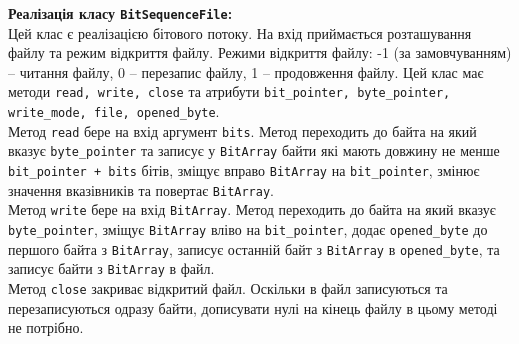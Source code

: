 \documentclass{article}
\def\code#1{\texttt{#1}}
\begin{document}
\textbf{Реалізація класу \code{BitSequenceFile}:}\\\indent
Цей клас є реалізацією бітового потоку. 
На вхід приймається розташування файлу та режим відкриття файлу. Режими відкриття файлу: -1 (за замовчуванням) -- читання файлу, 0 -- перезапис файлу, 1 -- продовження файлу. 
Цей клас має методи \code{read, write, close} та атрибути \code{bit\_pointer, byte\_pointer, write\_mode, file, opened\_byte}.\\\indent
Метод \code{read} бере на вхід аргумент \code{bits}. Метод переходить до байта на який вказує \code{byte\_pointer} та записує у \code{BitArray} байти які мають довжину не менше \code{bit\_pointer + bits} бітів, зміщує вправо \code{BitArray} на \code{bit\_pointer}, змінює значення вказівників та повертає \code{BitArray}.\\\indent
Метод \code{write} бере на вхід \code{BitArray}. Метод переходить до байта на який вказує \code{byte\_pointer}, зміщує \code{BitArray} вліво на \code{bit\_pointer}, додає \code{opened\_byte} до першого байта з \code{BitArray}, записує останній байт з \code{BitArray} в \code{opened\_byte}, та записує байти з \code{BitArray} в файл.\\\indent
Метод \code{close} закриває відкритий файл. Оскільки в файл записуються та перезаписуються одразу байти, дописувати нулі на кінець файлу в цьому методі не потрібно.\\\indent
\end{document}
